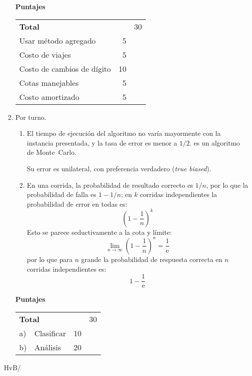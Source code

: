 \documentclass[english, spanish, fleqn]{article}
\begin{document}
\begin{enumerate}
    \vspace*{2\baselineskip}
    \begin{minipage}{1.0\linewidth}
      {\Large\textbf{Puntajes}}\\[0.5\baselineskip]
      \begin{tabular}{lrr}
	\textbf{Total}					     &	  & 30 \\
	Usar método agregado				     &	5 &    \\
	Costo de viajes					     &	5 &    \\
	Costo de cambios de dígito			     & 10 &    \\
	Cotas manejables				     &	5 &    \\
	Costo amortizado				     &	5 &
      \end{tabular}
    \end{minipage}
\pagebreak[4]
  \item %
    Por turno.
    \begin{enumerate}
    \item %
      El tiempo de ejecución del algoritmo
      no varía mayormente con la instancia presentada,
      y la tasa de error es menor a \(1/2\).
      es un algoritmo de Monte~Carlo.
      
      Su error es unilateral,
      con preferencia verdadero
      (\emph{\foreignlanguage{english}{true biased}}).
    \item %
      En una corrida,
      la probabilidad de resultado correcto es \(1/n\),
      por lo que la probabilidad de falla es \(1 - 1/n\);
      en \(k\) corridas independientes la probabilidad de error en todas
      es:
      \begin{equation*}
        \left( 1 - \frac{1}{n} \right)^k
      \end{equation*}
      Esto se parece seductivamente a la cota y límite:
      \begin{equation*}
        \lim_{n \to \infty} \left( 1 - \frac{1}{n} \right)^n
          = \frac{1}{\mathrm{e}}
      \end{equation*}
      por lo que para \(n\) grande la probabilidad de respuesta correcta
      en \(n\) corridas independientes es:
      \begin{equation*}
        1 - \frac{1}{\mathrm{e}}
      \end{equation*}
    \end{enumerate}

  \vspace*{2\baselineskip}
  \begin{minipage}{1.0\linewidth}
    {\Large\textbf{Puntajes}}\\[0.5\baselineskip]
    \begin{tabular}{l@{\;}lrr}
      \multicolumn{2}{l}{\textbf{Total}}	       &    & 30 \\
      a) & Clasificar                                  & 10 &    \\
      b) & Análisis                                    & 20 &
    \end{tabular}
  \end{minipage}
  \end{enumerate}
  \vfill\hfill HvB/\LaTeXe
\end{document}
